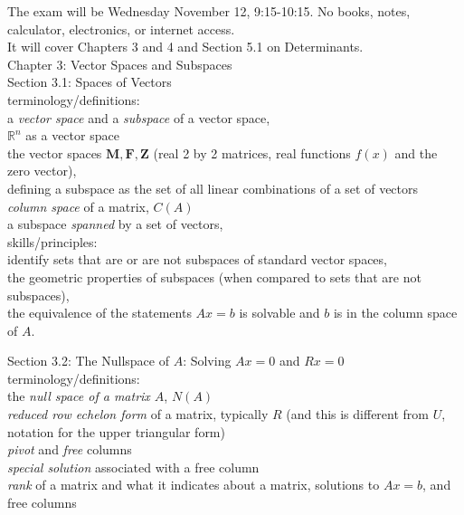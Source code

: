 \documentclass[11pt,fleqn]{article}
\begin{document}
\renewcommand{\headrulewidth}{0pt}
\newcommand{\blank}[1]{\rule{#1}{0.75pt}}
\renewcommand{\d}{\displaystyle}

The exam will be Wednesday November 12, 9:15-10:15. No books, notes, calculator, electronics, or internet access.\\

It will cover Chapters 3 and 4 and Section 5.1 on Determinants.\\

\noindent Chapter 3: Vector Spaces and Subspaces\\
Section 3.1: Spaces of Vectors\\

terminology/definitions: \\
a \emph{vector space} and a \emph{subspace} of a vector space, \\
$\mathbb{R}^n$ as a vector space\\
the vector spaces $\mathbf{M, F, Z}$ (real 2 by 2 matrices, real functions $f(x)$ and the zero vector), \\
defining a subspace as the set of all linear combinations of a set of vectors\\
\emph{column space} of a matrix, $C(A)$\\
a subspace \emph{spanned} by a set of vectors, \\

skills/principles: \\
identify sets that are or are not subspaces of standard vector spaces, \\
the geometric properties of subspaces (when compared to sets that are not subspaces), \\
the equivalence of the statements $Ax=b$ is solvable and $b$ is in the column space of $A.$\\

\vskip 0.1in

\noindent Section 3.2: The Nullspace of $A$: Solving $Ax=0$ and $Rx=0$\\

terminology/definitions: \\
the \emph{null space of a matrix $A$}, $N(A)$\\
\emph{reduced row echelon form} of a matrix, typically $R$ (and this is different from $U$, notation for the upper triangular form)\\
\emph{pivot} and \emph{free} columns\\
\emph{special solution} associated with a free column\\
\emph{rank} of a matrix and what it indicates about a matrix, solutions to $Ax=b$, and free columns\\
\end{document}
